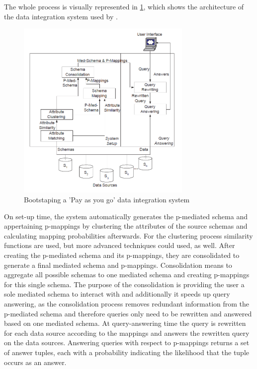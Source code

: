The whole process is visually represented in \ref{BootstrappingPayAsYouGoDISystems1}, which shows the architecture of the data integration system used by \cite{DasSarma:2008:BPD:1376616.1376702}.

\begin{figure}[H]
	\begin{center}
		\includegraphics[width=0.75\textwidth]{figures/BootstrappingPayAsYouGoDISystems1.png}
	\end{center}
	\caption{Bootstaping a 'Pay as you go' data integration system}
	\label{BootstrappingPayAsYouGoDISystems1}
\end{figure}

On set-up time, the system automatically generates the p-mediated schema and appertaining p-mappings by clustering the attributes of the source schemas and calculating mapping probabilities afterwards. For the clustering process similarity functions are used, but more advanced techniques could used, as well. After creating the p-mediated schema and its p-mappings, they are consolidated to generate a final mediated schema and p-mappings. Consolidation means to aggregate all possible schemas to one mediated schema and creating p-mappings for this single schema. The purpose of the consolidation is providing the user a sole mediated schema to interact with and additionally it speeds up query answering, as the consolidation process removes redundant information from the p-mediated schema and therefore queries only need to be rewritten and answered based on one mediated schema.
At query-answering time the query is rewritten for each data source according to the mappings and answers the rewritten query on the data sources. Answering queries with respect to p-mappings returns a set of answer tuples, each with a probability indicating the likelihood that the tuple occurs as an answer.

